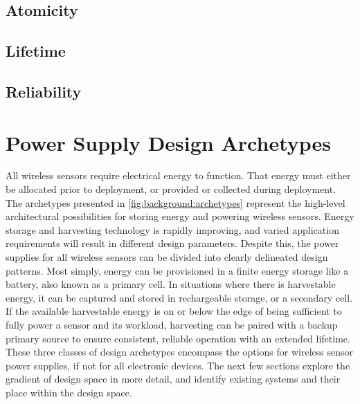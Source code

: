 \subsection{Atomicity}

\subsection{Lifetime}

\subsection{Reliability}





\section{Power Supply Design Archetypes}

All wireless sensors require electrical energy to function. 
That energy must either be allocated prior to deployment, or provided or collected during deployment. 
The archetypes presented in \cref{fig:background:archetypes} represent the high-level architectural possibilities for storing energy and powering wireless sensors.
Energy storage and harvesting technology is rapidly improving, and varied application requirements will result in different design parameters. Despite this, the power supplies for all wireless sensors can be divided into clearly delineated design patterns. 
Most simply, energy can be provisioned in a finite energy storage like a battery, also known as a primary cell. In situations where there is harvestable energy, it can be captured and stored in rechargeable storage, or a secondary cell. 
If the available harvestable energy is on or below the edge of being sufficient to fully power a sensor and its workload, harvesting can be paired with a backup primary source to ensure consistent, reliable operation with an extended lifetime. 
These three classes of design archetypes encompass the options for wireless sensor power supplies, if not for all electronic devices. 
The next few sections explore the gradient of design space in more detail, and identify existing systems and their place within the design space. 

